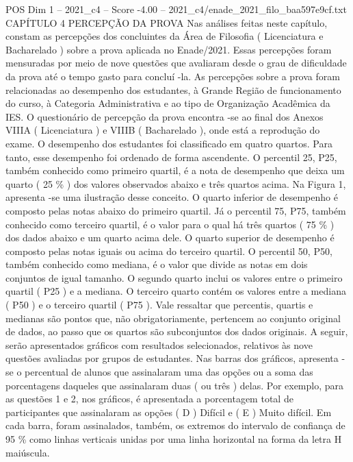 \begin{textsample}{POS Dim 1 – 2021\_c4 – Score -4.00 – 2021\_c4/enade\_2021\_filo\_baa597e9cf.txt}  \label{ex:f1_pos_375}
CAPÍTULO 4 PERCEPÇÃO DA PROVA Nas análises feitas neste capítulo, constam as percepções dos concluintes da Área de Filosofia ( Licenciatura e Bacharelado ) sobre a prova aplicada no Enade/2021.
Essas percepções foram mensuradas por meio de nove questões que avaliaram desde o grau de dificuldade da prova até o tempo gasto para concluí -la.
As percepções sobre a prova foram relacionadas ao desempenho dos estudantes, à Grande Região de funcionamento do curso, à Categoria Administrativa e ao tipo de Organização Acadêmica da IES.
O questionário de percepção da prova encontra -se ao final dos Anexos VIIIA ( Licenciatura ) e VIIIB ( Bacharelado ), onde está a reprodução do exame.
O desempenho dos estudantes foi classificado em quatro quartos.
Para tanto, esse desempenho foi ordenado de forma ascendente.
O percentil 25, P25, também conhecido como primeiro quartil, é a nota de desempenho que deixa um quarto ( 25 \% ) dos valores observados abaixo e três quartos acima.
Na Figura 1, apresenta -se uma ilustração desse conceito.
O quarto inferior de desempenho é composto pelas notas abaixo do primeiro quartil.
Já o percentil 75, P75, também conhecido como terceiro quartil, é o valor para o qual há três quartos ( 75 \% ) dos dados abaixo e um quarto acima dele.
O quarto superior de desempenho é composto pelas notas iguais ou acima do terceiro quartil.
O percentil 50, P50, também conhecido como mediana, é o valor que divide as notas em dois conjuntos de igual tamanho.
O segundo quarto inclui os valores entre o primeiro quartil ( P25 ) e a mediana.
O terceiro quarto contém os valores entre a mediana ( P50 ) e o terceiro quartil ( P75 ).
Vale ressaltar que percentis, quartis e medianas são pontos que, não obrigatoriamente, pertencem ao conjunto original de dados, ao passo que os quartos são subconjuntos dos dados originais.
A seguir, serão apresentados gráficos com resultados selecionados, relativos às nove questões avaliadas por grupos de estudantes.
Nas barras dos gráficos, apresenta -se o percentual de alunos que assinalaram uma das opções ou a soma das porcentagens daqueles que assinalaram duas ( ou três ) delas.
Por exemplo, para as questões 1 e 2, nos gráficos, é apresentada a porcentagem total de participantes que assinalaram as opções ( D ) Difícil e ( E ) Muito difícil.
Em cada barra, foram assinalados, também, os extremos do intervalo de confiança de 95 \% como linhas verticais unidas por uma linha horizontal na forma da letra H maiúscula.

\end{textsample}
